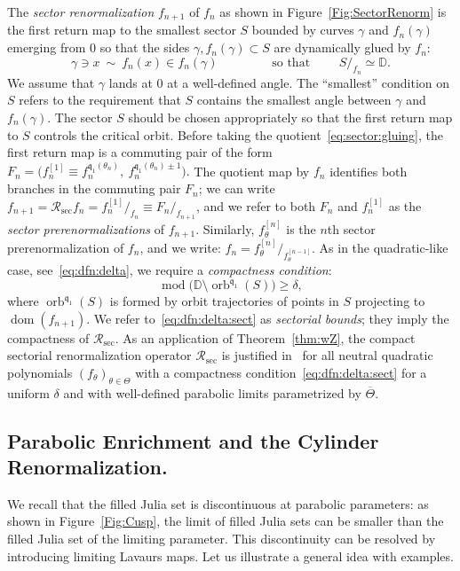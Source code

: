 \documentclass[twoside,leqno]{article}
\theoremstyle{plain}
\newcommand{\Disk}{\mathbb{D}}
\renewcommand{\mod}{\operatorname{mod}}
\newcommand{\orb}{\operatorname{orb}}
\renewcommand{\sec}{{\operatorname{sec}}}
\newcommand{\ovlTheta}{{\overline \Theta}}
\newcommand{\qq}{\mathfrak{q}}
\newcommand{\RR}{{\mathcal R}}
\begin{document}
The \emph{sector renormalization} $f_{n+1}$ of $f_n$ as shown in Figure~\ref{Fig:SectorRenorm} is the first return map to the smallest sector $S$ bounded by curves $\gamma$ and $f_n(\gamma)$ emerging from $0$ so that the sides $\gamma,  f_n(\gamma)\subset S$ are dynamically glued by $f_n$: 
\begin{equation}
    \label{eq:sector:gluing} \gamma \ni x \ \sim \ f_n(x) \in f_n(\gamma)\qquad\qquad \text{ so that }\qquad S/_{f_n} \simeq \Disk.
\end{equation}
 We assume that $\gamma$ lands at $0$ at a well-defined angle. The ``smallest'' condition on $S$ refers to the requirement that $S$ contains the smallest angle between $\gamma$ and $f_n(\gamma)$. The sector $S$ should be chosen appropriately so that the first return map to $S$ controls the critical orbit. Before taking the quotient~\eqref{eq:sector:gluing}, the first return map is a commuting pair of the form $F_n=\big(f_n^{[1]}\equiv f^{\qq_1(\theta_n)}_n,\ f^{\qq_1(\theta_n)\pm 1}_n\big).$ The quotient map by $f_n$ identifies both branches in the commuting pair $F_n$; we can write $f_{n+1}= \RR_\sec f_n=f_n^{[1]}/_{f_n}\equiv F_n/_{f_{n+1}}$, and we refer to both $F_n$ and $f_n^{[1]}$ as the \emph{sector prerenormalizations} of $f_{n+1}$. Similarly, $f^{[n]}_\theta$ is the $n$th sector prerenormalization of $f_n$, and we write: $f_{n}= f^{[n]}_\theta/_{f^{[n-1]}_\theta}$. As in the quadratic-like case, see~\eqref{eq:dfn:delta}, we require a \emph{compactness condition}:
\begin{equation}
    \label{eq:dfn:delta:sect} \mod\big(\Disk\setminus \orb^{\qq_1} (S)\big)\ge \delta, 
\end{equation}
where $\orb^{\qq_1} (S)$ is formed by orbit trajectories of points in $S$ projecting to $\operatorname{dom} (f_{n+1})$. We refer to~\eqref{eq:dfn:delta:sect} as \emph{sectorial bounds}; they imply the compactness of $\RR_\sec$. As an application of Theorem~\ref{thm:wZ}, the compact sectorial renormalization operator $\RR_\sec$ is justified in~\cite{DL:sector-bounds} for all neutral quadratic polynomials $(f_\theta)_{\theta\in \Theta}$ with a compactness condition~\eqref{eq:dfn:delta:sect} for a uniform $\delta$ and with well-defined parabolic limits parametrized by $\ovlTheta$. 




\subsection{Parabolic Enrichment and the Cylinder Renormalization.}\label{ss:renorm:parablic} We recall that the filled Julia set is discontinuous at parabolic parameters: as shown in Figure~\ref{Fig:Cusp}, the limit of filled Julia sets can be smaller than the filled Julia set of the limiting parameter. This discontinuity can be resolved by introducing limiting Lavaurs maps. Let us illustrate a general idea with examples. 
\end{document}
